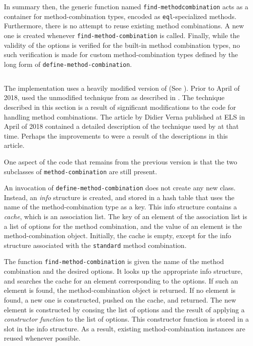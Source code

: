 In summary then, the generic function named \texttt{find-method\-combination}
acts as a container for method-combination types, encoded as
\texttt{eql}-specialized methods.  Furthermore, there is no attempt to
reuse existing method combinations.  A new one is created whenever
\texttt{find-method-combination} is called.  Finally, while the
validity of the options is verified for the built-in method
combination types, no such verification is made for custom
method-combination types defined by the long form of
\texttt{define-method-combination}.

\subsection{\sbcl{}}

The \sbcl{} \commonlisp{} implementation uses a heavily modified
version of \pcl{} (See ).  Prior to April of 2018,
\sbcl{} used the unmodified technique from \pcl{} as described in
.  The technique described in this section is a result
of significant modifications to the code for handling method
combinations.  The article by Didier Verna \cite{verna.18.els}
published at ELS in April of 2018 contained a detailed description of
the technique used by \sbcl{} at that time.  Perhaps the improvements
to \sbcl{} were a result of the descriptions in this article.

One aspect of the \sbcl{} code that remains from the previous version
is that the two subclasses of \texttt{method-combination} are still
present.

An invocation of \texttt{define-method-combination} does not create
any new class.  Instead, an \emph{info} structure is created, and
stored in a hash table that uses the name of the method-combination
type as a key.  This info structure contains a \emph{cache}, which is
an association list.  The key of an element of the association list is
a list of options for the method combination, and the value of an
element is the method-combination object.  Initially, the cache is
empty, except for the info structure associated with the
\texttt{standard} method combination.

The function \texttt{find-method-combination} is given the name of the
method combination and the desired options.  It looks up the
appropriate info structure, and searches the cache for an element
corresponding to the options.  If such an element is found, the
method-combination object is returned.  If no element is found, a new
one is constructed, pushed on the cache, and returned.  The new
element is constructed by consing the list of options and the result
of applying a \emph{constructor function} to the list of options.
This constructor function is stored in a slot in the info structure.
As a result, existing method-combination instances are reused whenever
possible.

